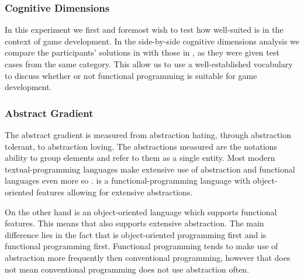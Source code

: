 \subsubsection{Cognitive Dimensions}
In this experiment we first and foremost wish to test how well-suited \fsh is in the context of game development. In the side-by-side cognitive dimensions analysis we compare the participants' solutions in \fsh with those in \csh, as they were given test cases from the same category. This allow us to use a well-established vocabulary to discuss whether or not functional programming is suitable for game development.


\subsubsection{Abstract Gradient}
The abstract gradient is measured from abstraction hating, through abstraction tolerant, to abstraction loving. The abstractions measured are the notations ability to group elements and refer to them as a single entity. Most modern textual-programming languages make extensive use of abstraction and functional languages even more so \cite{hudak1989conception}. \fsh is a functional-programming language with object-oriented features allowing for extensive abstractions.

On the other hand \cs is an object-oriented language which supports functional features. This means that \cs also supports extensive abstraction. The main difference lies in the fact that \cs is object-oriented programming first and \fs is functional programming first. Functional programming tends to make use of abstraction more frequently then conventional programming, however that does not mean conventional programming does not use abstraction often.

